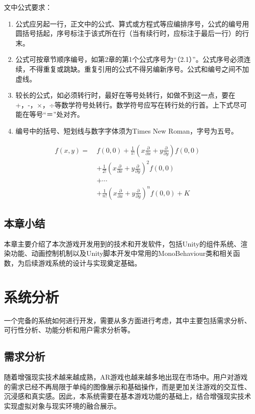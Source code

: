 \documentclass[12pt]{graduate-design-manual}
\begin{document}
文中公式要求：
\begin{enumerate}
    \item 公式应另起一行，正文中的公式、算式或方程式等应编排序号，公式的编号用圆括号括起，序号标注于该式所在行（当有续行时，应标注于最后一行）的行末。
    \item 公式可按章节顺序编号，如第2章的第1个公式序号为“（2.1）”。公式序号必须连续，不得重复或跳缺。重复引用的公式不得另编新序号。公式和编号之间不加虚线。
    \item 较长的公式，如必须转行时，最好在等号处转行，如做不到这一点，要在+，-，$\times$，$\div$等数学符号处转行。数学符号应写在转行处的行首。上下式尽可能在等号“＝”处对齐。
    \item 编号中的括号、短划线与数字字体须为Times New Roman，字号为五号。
\end{enumerate}

\begin{equation}
\begin{aligned}
f(x,y) =\ & f(0,0) + \frac{1}{1!}\left(x\frac{\partial}{\partial x} + y\frac{\partial}{\partial y}\right)f(0,0) \\
& + \frac{1}{2!}\left(x\frac{\partial}{\partial x} + y\frac{\partial}{\partial y}\right)^2 f(0,0) \\
& + \cdots \\
& + \frac{1}{n!}\left(x\frac{\partial}{\partial x} + y\frac{\partial}{\partial y}\right)^n f(0,0) + K
\end{aligned}
\end{equation}

\subsection{本章小结}
本章主要介绍了本次游戏开发用到的技术和开发软件，包括Unity的组件系统、渲染功能、动画控制机制以及Unity脚本开发中常用的MonoBehaviour类和相关函数，为后续游戏系统的设计与实现奠定基础。
\section{系统分析}
一个完备的系统如何进行开发，需要从多方面进行考虑，其中主要包括需求分析、可行性分析、功能分析和用户需求分析等。

\subsection{需求分析}
随着增强现实技术越来越成熟，AR游戏也越来越多地出现在市场中。用户对游戏的需求已经不再局限于单纯的图像展示和基础操作，而是更加关注游戏的交互性、沉浸感和真实感。因此，本系统需要在基本游戏功能的基础上，结合增强现实技术实现虚拟对象与现实环境的融合展示。
\end{document}
